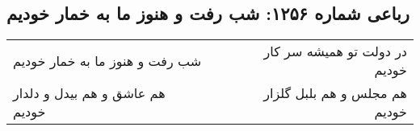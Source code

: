 \begin{center}
\section*{رباعی شماره ۱۲۵۶: شب رفت و هنوز ما به خمار خودیم}
\label{sec:1256}
\begin{longtable}{l p{0.5cm} r}
شب رفت و هنوز ما به خمار خودیم
&&
در دولت تو همیشه سر کار خودیم
\\
هم عاشق و هم بیدل و دلدار خودیم
&&
هم مجلس و هم بلبل گلزار خودیم
\\
\end{longtable}
\end{center}
